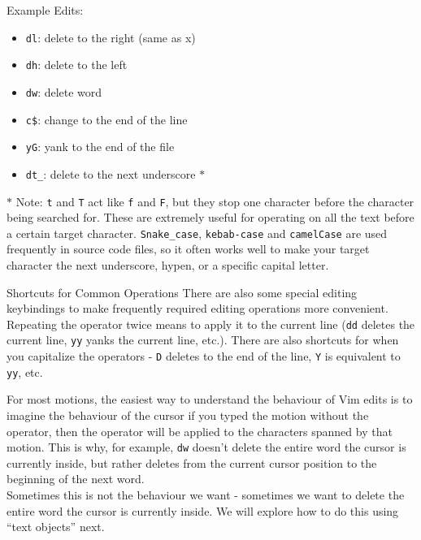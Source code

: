 \documentclass{beamer}
\begin{document}
\begin{frame}[fragile]
    \small
    Example Edits:
    \begin{itemize}
	\item \verb+dl+:  delete to the right (same as x)
	\item \verb+dh+:  delete to the left
	\item \verb+dw+:  delete word
	\item \verb+c$+:  change to the end of the line
	\item \verb+yG+:  yank to the end of the file
	\item \verb+dt_+:  delete to the next underscore $\ast$
    \end{itemize}
    $\ast$ Note: \verb+t+ and \verb+T+ act like \verb+f+ and \verb+F+, but they stop one character before the character being searched for. These are extremely useful for operating on all the text before a certain target character. \verb+Snake_case+, \verb+kebab-case+ and \verb+camelCase+ are used frequently in source code files, so it often works well to make your target character the next underscore, hypen, or a specific capital letter.
\end{frame}

\begin{frame}[fragile]
    \small
    \begin{block}{Shortcuts for Common Operations}
	There are also some special editing keybindings to make frequently required editing operations more convenient. Repeating the operator twice means to apply it to the current line (\verb+dd+ deletes the current line, \verb+yy+ yanks the current line, etc.). There are also shortcuts for when you capitalize the operators - \verb+D+ deletes to the end of the line, \verb+Y+ is equivalent to \verb+yy+, etc.
    \end{block}
\end{frame}

\begin{frame}[fragile]
    \small
    For most motions, the easiest way to understand the behaviour of Vim edits is to imagine the behaviour of the cursor if you typed the motion without the operator, then the operator will be applied to the characters spanned by that motion. This is why, for example, \verb+dw+ doesn't delete the entire word the cursor is currently inside, but rather deletes from the current cursor position to the beginning of the next word.\\
    \vspace{0.5cm}
    Sometimes this is not the behaviour we want - sometimes we want to delete the entire word the cursor is currently inside. We will explore how to do this using \enquote{text objects} next.
\end{frame}
\end{document}
